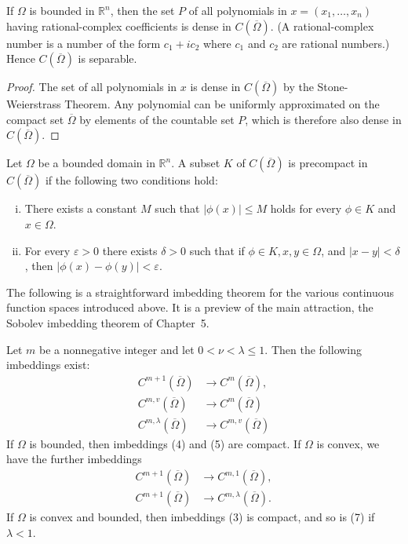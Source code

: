 \begin{corollary}
  If $\Omega$ is bounded in $\mathbb{R}^n$, then the set $P$ of all polynomials in $x=\left(x_1, \ldots, x_n\right)$ having rational-complex coefficients is dense in $C(\overline{\Omega})$. (A rational-complex number is a number of the form $c_1+i c_2$ where $c_1$ and $c_2$ are rational numbers.) Hence $C(\overline{\Omega})$ is separable.
\end{corollary}

\begin{proof}
  The set of all polynomials in $x$ is dense in $C(\overline{\Omega})$ by the Stone-Weierstrass Theorem. Any polynomial can be uniformly approximated on the compact set $\overline{\Omega}$ by elements of the countable set $P$, which is therefore also dense in $C(\overline{\Omega})$.
\end{proof}

\begin{theorem}
  Let $\Omega$ be a bounded domain in $\mathbb{R}^n$. A subset $K$ of $C(\overline{\Omega})$ is precompact in $C(\overline{\Omega})$ if the following two conditions hold:
  \begin{enumerate}[(i)]
    \item There exists a constant $M$ such that $|\phi(x)| \leq M$ holds for every $\phi \in K$ and $x \in \Omega$.
    \item For every $\varepsilon>0$ there exists $\delta>0$ such that if $\phi \in K, x, y \in \Omega$, and $|x-y|<\delta$, then $|\phi(x)-\phi(y)|<\varepsilon$.
  \end{enumerate}
\end{theorem}
The following is a straightforward imbedding theorem for the various continuous function spaces introduced above. It is a preview of the main attraction, the Sobolev imbedding theorem of Chapter~5.

\begin{theorem}
  Let $m$ be a nonnegative integer and let $0<\nu<\lambda \leq 1$. Then the following imbeddings exist:
  \begin{align}
    C^{m+1}(\overline{\Omega})  & \rightarrow C^m(\overline{\Omega}), \label{eq:1.3} \\
    C^{m, v}(\overline{\Omega}) & \rightarrow C^m(\overline{\Omega}) \label{eq:1.4} \\
    C^{m, \lambda}(\overline{\Omega}) & \rightarrow C^{m, v}(\overline{\Omega}) \label{eq:1.5}
  \end{align}
  If $\Omega$ is bounded, then imbeddings (4) and (5) are compact. If $\Omega$ is convex, we have the further imbeddings
  \begin{align}
    C^{m+1}(\overline{\Omega}) & \rightarrow C^{m, 1}(\overline{\Omega}), \label{eq:1.6} \\
    C^{m+1}(\overline{\Omega}) & \rightarrow C^{m, \lambda}(\overline{\Omega}). \label{eq:1.7}
  \end{align}
  If $\Omega$ is convex and bounded, then imbeddings (3) is compact, and so is (7) if $\lambda<1$.
\end{theorem}

